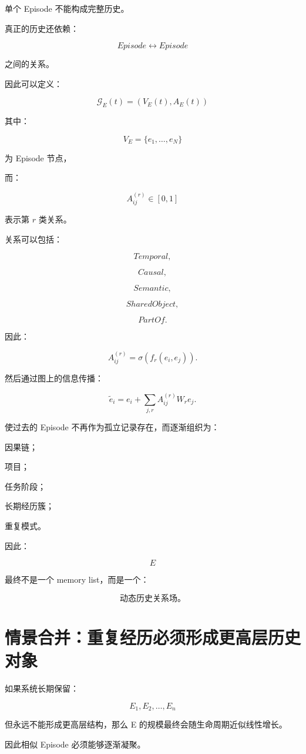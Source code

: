 单个 Episode 不能构成完整历史。

真正的历史还依赖：

\[
\boxed{
Episode
\leftrightarrow
Episode
}
\]

之间的关系。

因此可以定义：

\[
\boxed{
\mathcal G_E(t)
=
(
V_E(t),
A_E(t)
)
}
\]

其中：

\[
V_E
=
\{
e_1,\ldots,e_N
\}
\]

为 Episode 节点，

而：

\[
A_{ij}^{(r)}
\in[0,1]
\]

表示第 \(r\) 类关系。

关系可以包括：

\[
Temporal,
\]

\[
Causal,
\]

\[
Semantic,
\]

\[
SharedObject,
\]

\[
PartOf.
\]

因此：

\[
\boxed{
A_{ij}^{(r)}
=
\sigma
\left(
f_r(e_i,e_j)
\right).
}
\]

然后通过图上的信息传播：

\[
\boxed{
\tilde e_i
=
e_i
+
\sum_{j,r}
A_{ij}^{(r)}
W_r e_j.
}
\]

使过去的 Episode 不再作为孤立记录存在，而逐渐组织为：

因果链；

项目；

任务阶段；

长期经历簇；

重复模式。

因此：

\[
\boxed{
E
}
\]

最终不是一个 memory list，而是一个：

\[
\boxed{
\textbf{动态历史关系场。}
}
\]


\section{情景合并：重复经历必须形成更高层历史对象}

如果系统长期保留：

\[
E_1,E_2,\ldots,E_n
\]

但永远不能形成更高层结构，那么 E 的规模最终会随生命周期近似线性增长。

因此相似 Episode 必须能够逐渐凝聚。

